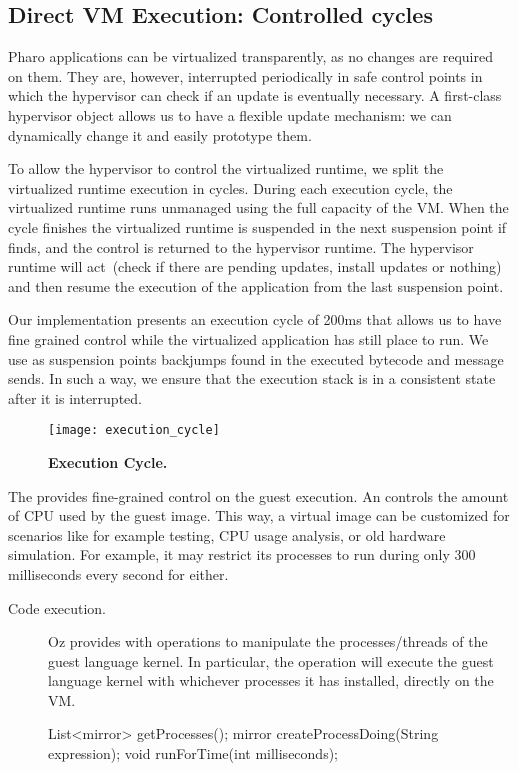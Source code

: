 \subsection{Direct VM Execution: Controlled cycles}

Pharo applications can be virtualized transparently, as no changes are required on them. They are, however, interrupted periodically in safe control points in which the hypervisor can check if an update is eventually necessary. A first-class hypervisor object allows us to have a flexible update mechanism: we can dynamically change it and easily prototype them.

To allow the hypervisor to control the virtualized runtime, we split the virtualized runtime execution in cycles. During each execution cycle, the virtualized runtime runs unmanaged using the full capacity of the VM. When the cycle finishes the virtualized runtime is suspended in the next suspension point if finds, and the control is returned to the hypervisor runtime. The hypervisor runtime will act~(check if there are pending updates, install updates or nothing) and then resume the execution of the application from the last suspension point.

Our implementation presents an execution cycle of 200ms that allows us to have fine grained control while the virtualized application has still place to run. We use as suspension points backjumps found in the executed bytecode and message sends. In such a way, we ensure that the execution stack is in a consistent state after it is interrupted.

\begin{figure}[ht]
\center
\texttt{[image: execution\_cycle]}
\caption{\textbf{Execution Cycle.} \label{fig:execution_cycle}}
\end{figure}

The \objectspace provides fine-grained control on the guest execution. An \objectspace controls the amount of CPU used by the guest image. This way, a virtual image can be customized for scenarios like for example testing, CPU usage analysis, or old hardware simulation. For example, it may restrict its processes to run during only 300 milliseconds every second for either.

\begin{description}
\item[Code execution.] Oz provides with operations to manipulate the processes/threads of the guest language kernel. In particular, the  operation will execute the guest language kernel with whichever processes it has installed, directly on the VM.
\begin{code}
List<mirror> getProcesses();
mirror createProcessDoing(String expression);
void runForTime(int milliseconds);
\end{code}
\end{description}

